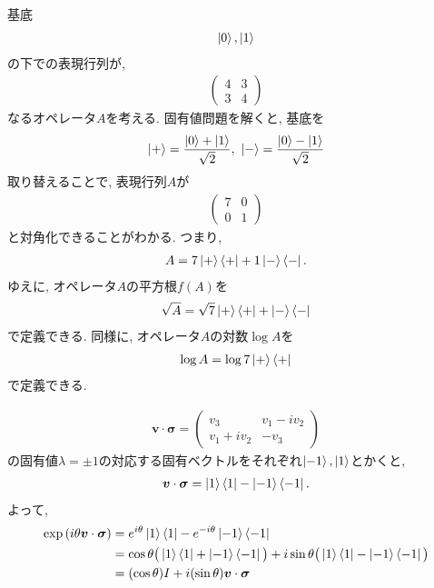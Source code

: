 \begin{ex}
    \label{ex2.34}
    基底
    \begin{align*}
        \ket{0}, \ket{1}
    \end{align*}
    の下での表現行列が,
    \begin{align*}
        \begin{pmatrix}
            4 & 3 \\
            3 & 4
        \end{pmatrix}
    \end{align*}
    なるオペレータ$A$を考える.
    固有値問題を解くと, 基底を
    \begin{align*}
        \ket{+} = \frac{\ket{0}+\ket{1}}{\sqrt{2}},\ \ket{-} = \frac{\ket{0}-\ket{1}}{\sqrt{2}}
    \end{align*}
    取り替えることで, 表現行列$A$が
    \begin{align*}
        \begin{pmatrix}
            7 & 0 \\
            0 & 1
        \end{pmatrix}
    \end{align*}
    と対角化できることがわかる. つまり,
    \begin{align*}
        A = 7 \ket{+}\bra{+} + 1 \ket{-}\bra{-} .
    \end{align*}
    ゆえに, オペレータ$A$の平方根$f(A)$を
    \begin{align*}
        \sqrt{A} = \sqrt{7} \ket{+}\bra{+} +  \ket{-}\bra{-}
    \end{align*}
    で定義できる. 同様に, オペレータ$A$の対数$\log{A}$を
    \begin{align*}
        \log{A} = \log{7} \ket{+}\bra{+}
    \end{align*}
    で定義できる.
\end{ex}

\begin{ex}
    \label{ex2.35}
    \begin{align*}
        \bm{v} \cdot \bm{\sigma}
        =
        \begin{pmatrix}
            v_3         & v_1 - i v_2 \\
            v_1 + i v_2 & - v_3
        \end{pmatrix}
    \end{align*}
    の固有値$\lambda = \pm 1$の対応する固有ベクトルをそれぞれ$\ket{-1}, \ket{1}$とかくと,
    \begin{align*}
        \bm{v} \cdot \bm{\sigma} = \ket{1}\bra{1} - \ket{-1}\bra{-1} .
    \end{align*}
    よって,
    \begin{align*}
        \exp{\left( i \theta \bm{v} \cdot \bm{\sigma} \right)}
         & =
        e^{i \theta} \ket{1}\bra{1} - e^{- i \theta} \ket{-1}\bra{-1} \\
         & =
        \cos{\theta} \big(\ket{1}\bra{1} + \ket{-1}\bra{-1} \big)
        + i \sin{\theta} \big(\ket{1}\bra{1} - \ket{-1}\bra{-1} \big)
        \\
         & =
        (\cos{\theta}) I + i (\sin{\theta}) \bm{v} \cdot \bm{\sigma}
    \end{align*}
\end{ex}

